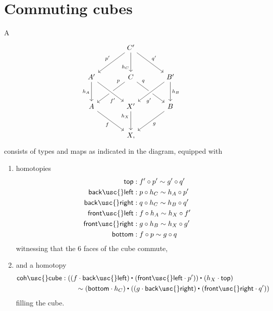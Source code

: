 \section{Commuting cubes}
\begin{defn}\label{defn:cube}
A 
\begin{equation*}
\begin{tikzcd}[column sep=large,row sep=large]
& C' \arrow[dl,swap,"{p'}"] \arrow[dr,"{q'}"] \arrow[d,swap,"{h_C}" near end] \\
A' \arrow[d,swap,"{h_A}"] & C \arrow[dl,swap,"{p}" very near start] \arrow[dr,"{q}" very near start] & B' \arrow[dl,crossing over,"{g'}" near end] \arrow[d,"{h_B}"] \\
A \arrow[dr,swap,"f"] & X' \arrow[d,swap,"{h_X}" near start] \arrow[from=ul,crossing over,swap,"{f'}" near end] & B \arrow[dl,"{g}"] \\
& X,
\end{tikzcd}
\end{equation*}
consists of types and maps as indicated in the diagram, equipped with
\begin{enumerate}
\item homotopies
  \begin{align*}
    \mathsf{top} & : f' \circ p' \htpy g' \circ q' \\
    \mathsf{back\usc{}left} & : p \circ h_C \htpy h_A \circ p' \\
    \mathsf{back\usc{}right} & : q \circ h_C \htpy h_B \circ q' \\
    \mathsf{front\usc{}left} & : f \circ h_A \htpy h_X \circ f' \\
    \mathsf{front\usc{}right} & : g \circ h_B \htpy h_X \circ g' \\
    \mathsf{bottom} & : f \circ p \htpy g \circ q
  \end{align*}
  witnessing that the 6 faces of the cube commute,
\item and a homotopy 
  \begin{align*}
\mathsf{coh\usc{}cube} & : \ct{(\ct{(f \cdot \mathsf{back\usc{}left})}{(\mathsf{front\usc{}left}\cdot p')})}{(h_X \cdot \mathsf{top})} \\
& \qquad \htpy \ct{(\mathsf{bottom}\cdot h_C)}{(\ct{(g \cdot \mathsf{back\usc{}right})}{(\mathsf{front\usc{}right}\cdot q')})}
\end{align*}
filling the cube.
\end{enumerate}
\end{defn}

